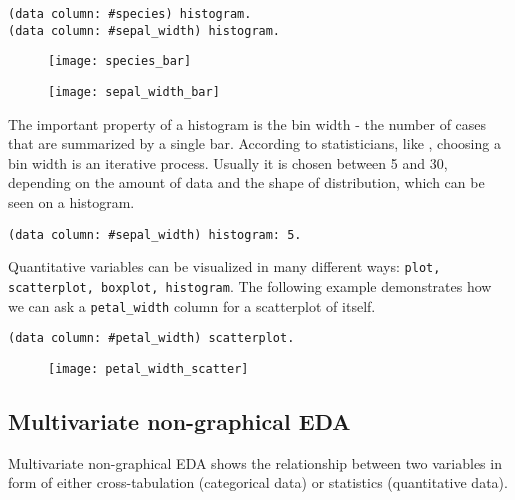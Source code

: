 \documentclass[sigplan]{acmart}
\begin{document}
\begin{lstlisting}[basicstyle=\small,language=Smalltalk]
(data column: #species) histogram.
(data column: #sepal_width) histogram.
\end{lstlisting}

\begin{figure}[H]
  \begin{center}
  \texttt{[image: species\_bar]}
  \end{center}
  \begin{center}
  \texttt{[image: sepal\_width\_bar]}
  \end{center}
\end{figure}

The important property of a histogram is the bin width - the number of cases that are summarized by a single bar. According to statisticians, like \cite{Seltman}, choosing a bin width is an iterative process. Usually it is chosen between 5 and 30, depending on the amount of data and the shape of distribution, which can be seen on a histogram.

\begin{lstlisting}[basicstyle=\small,language=Smalltalk]
(data column: #sepal_width) histogram: 5.
\end{lstlisting}

Quantitative variables can be visualized in many different ways: \texttt{plot, scatterplot, boxplot, histogram}. The following example demonstrates how we can ask a \texttt{petal\_width} column for a scatterplot of itself.
 
\begin{lstlisting}[basicstyle=\small,language=Smalltalk]
(data column: #petal_width) scatterplot.
\end{lstlisting}
\begin{figure}[H]
  \begin{center}
  \texttt{[image: petal\_width\_scatter]}
  \end{center}
\end{figure}

\subsection{Multivariate non-graphical EDA}
\label{sec:multi-non}

Multivariate non-graphical EDA shows the relationship between two variables in form of either cross-tabulation (categorical data) or statistics (quantitative data).
\end{document}
